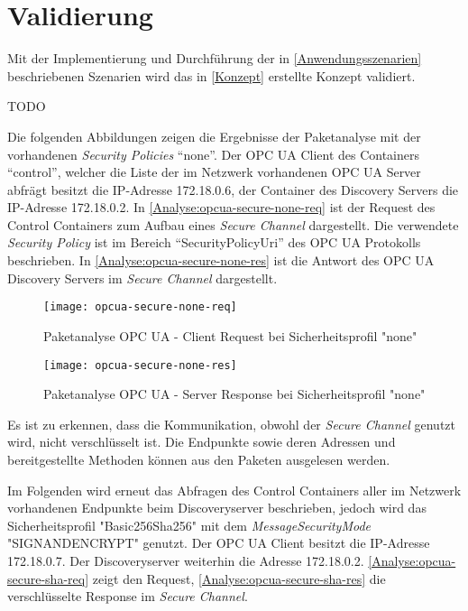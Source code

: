 \chapter{Validierung}
Mit der Implementierung und Durchführung der in \autoref{Anwendungsszenarien} beschriebenen Szenarien wird das in \autoref{Konzept} erstellte Konzept validiert.

TODO

Die folgenden Abbildungen zeigen die Ergebnisse der Paketanalyse mit der vorhandenen \textit{Security Policies} "`none"'. Der \ac{OPC UA} Client des Containers "`control"', welcher die Liste der im Netzwerk vorhandenen \ac{OPC UA} Server abfrägt besitzt die \ac{IP}-Adresse 172.18.0.6, der Container des Discovery Servers die \ac{IP}-Adresse 172.18.0.2. In \autoref{Analyse:opcua-secure-none-req} ist der Request des Control Containers zum Aufbau eines \textit{Secure Channel} dargestellt. Die verwendete \textit{Security Policy} ist im Bereich "`SecurityPolicyUri"' des \ac{OPC UA} Protokolls beschrieben. In \autoref{Analyse:opcua-secure-none-res} ist die Antwort des \ac{OPC UA} Discovery Servers im \textit{Secure Channel} dargestellt. 

\begin{figure}[h]
  \centering
  \texttt{[image: opcua-secure-none-req]}
  \caption{Paketanalyse OPC UA - Client Request bei Sicherheitsprofil "none"} 
  \label{Analyse:opcua-secure-none-req}
\end{figure}

\begin{figure}[h]
  \centering
  \texttt{[image: opcua-secure-none-res]}
  \caption{Paketanalyse OPC UA - Server Response bei Sicherheitsprofil "none"} 
  \label{Analyse:opcua-secure-none-res}
\end{figure}

\clearpage

Es ist zu erkennen, dass die Kommunikation, obwohl der \textit{Secure Channel} genutzt wird, nicht verschlüsselt ist. Die Endpunkte sowie deren Adressen und bereitgestellte Methoden können aus den Paketen ausgelesen werden.

Im Folgenden wird erneut das Abfragen des Control Containers aller im Netzwerk vorhandenen Endpunkte beim Discoveryserver beschrieben, jedoch wird das Sicherheitsprofil "Basic256Sha256" mit dem \textit{MessageSecurityMode} "SIGNANDENCRYPT" genutzt. Der \ac{OPC UA} Client besitzt die \ac{IP}-Adresse 172.18.0.7. Der Discoveryserver weiterhin die Adresse 172.18.0.2. \autoref{Analyse:opcua-secure-sha-req} zeigt den Request, \autoref{Analyse:opcua-secure-sha-res} die verschlüsselte Response im \textit{Secure Channel}.

